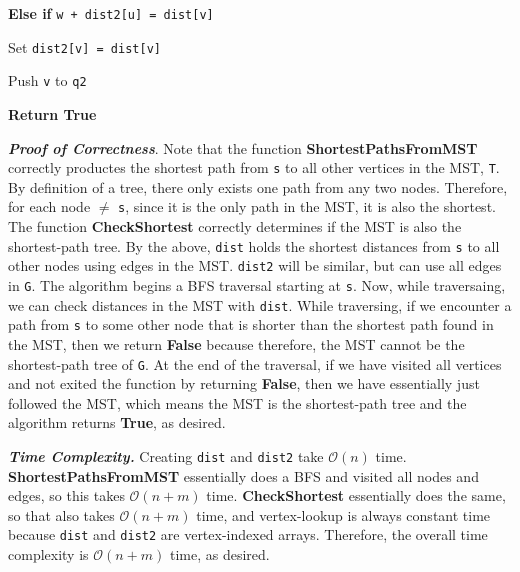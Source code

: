 \documentclass[11pt]{article}
\begin{document}
\begin{enumerate}[leftmargin=*,start=0]
\begin{enumerate}
\hspace{15mm} \textbf{Else if} \verb|w + dist2[u] = dist[v]|

\hspace{20mm} Set \verb|dist2[v] = dist[v]|

\hspace{20mm} Push \verb|v| to \verb|q2|

\hspace{5mm} \textbf{Return True}
\end{enumerate}

\textbf{\textit{Proof of Correctness}}. Note that the function \textbf{ShortestPathsFromMST} correctly productes the shortest 
path from \verb|s| to all other vertices in the MST, \verb|T|. By definition of a tree, there only exists one path from any two nodes. 
Therefore, for each node $\neq$ \verb|s|, since it is the only path in the MST, it is also the shortest. The function 
\textbf{CheckShortest} correctly determines if the MST is also the shortest-path tree. By the above, \verb|dist| holds the shortest distances from 
\verb|s| to all other nodes using edges in the MST. \verb|dist2| will be similar, but can use all edges in \verb|G|. The 
algorithm begins a BFS traversal starting at \verb|s|. Now, while traversaing, we can check distances in the MST with \verb|dist|. While traversing, if we encounter a path from \verb|s| to some other node that is shorter 
than the shortest path found in the MST, then we return \textbf{False} because therefore, the MST cannot be the shortest-path tree of \verb|G|. 
At the end of the traversal, if we have visited all vertices and not exited the function by returning \textbf{False}, then we have 
essentially just followed the MST, which means the MST is the shortest-path tree and the algorithm returns \textbf{True}, as desired.

\hfill

\textbf{\textit{Time Complexity.}} Creating \verb|dist| and \verb|dist2| take $\mathcal{O}(n)$ time. \textbf{ShortestPathsFromMST}
essentially does a BFS and visited all nodes and edges, so this takes $\mathcal{O}(n + m)$ time. \textbf{CheckShortest} essentially 
does the same, so that also takes $\mathcal{O}(n + m)$ time, and vertex-lookup is always constant time because \verb|dist| and \verb|dist2| 
are vertex-indexed arrays. Therefore, the overall time complexity is $\mathcal{O}(n + m)$ time, as desired.

\newpage


\end{enumerate}
\end{document}

